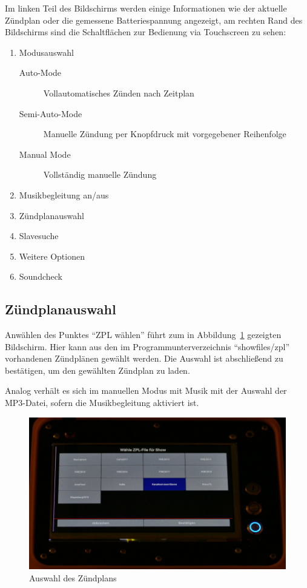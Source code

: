 \documentclass[paper=a4, parskip, numbers=noenddot, toc=listof, headsepline]{scrbook}
\begin{document}
			Im linken Teil des Bildschirms werden einige Informationen wie der aktuelle Zündplan oder die gemessene Batteriespannung angezeigt, am rechten Rand des Bildschirms sind die Schaltflächen zur Bedienung via Touchscreen zu sehen:
			\begin{enumerate}
				\item
				      Modusauswahl
				      \begin{description}
					      \item [Auto-Mode]
					            Vollautomatisches Zünden nach Zeitplan
					      \item [Semi-Auto-Mode]
					            Manuelle Zündung per Knopfdruck mit vorgegebener Reihenfolge
					      \item [Manual Mode]
					            Vollständig manuelle Zündung
				      \end{description}
				\item
				      Musikbegleitung an/aus
				\item
				      Zündplanauswahl
				\item
				      Slavesuche
				\item
				      Weitere Optionen
				\item
				      Soundcheck
			\end{enumerate}

			\subsection{Zündplanauswahl}

				Anwählen des Punktes \enquote{ZPL wählen} führt zum in Abbildung~\ref{fig:REFzplwahl} gezeigten Bildschirm. Hier kann aus den im Programmunterverzeichnis \enquote{showfiles/zpl} vorhandenen Zündplänen gewählt werden. Die Auswahl ist abschließend zu bestätigen, um den gewählten Zündplan zu laden.

				Analog verhält es sich im manuellen Modus mit Musik mit der Auswahl der MP3-Datei, sofern die Musikbegleitung aktiviert ist.

				\begin{figure}
					\centering\includegraphics[width=150mm]{Bilder/REFzplwahl}
					\caption{Auswahl des Zündplans}
					\label{fig:REFzplwahl}
				\end{figure}
\end{document}
